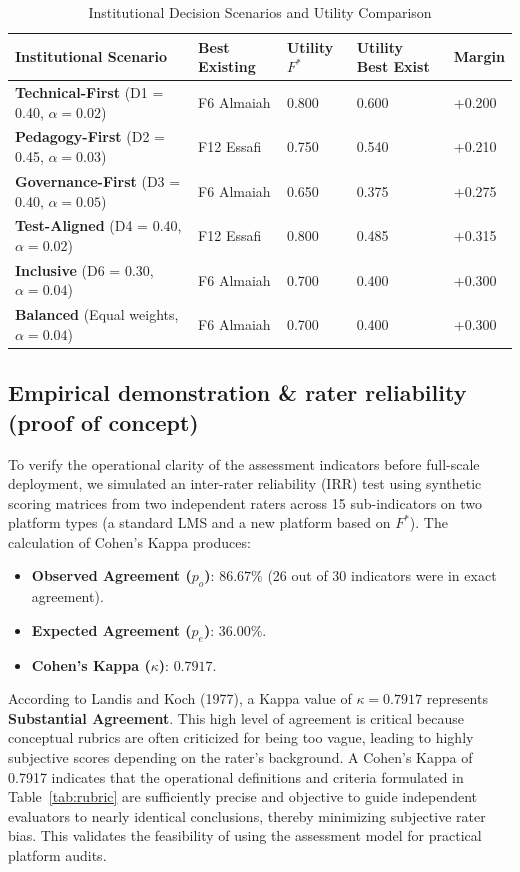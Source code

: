 \documentclass[11pt,a4paper]{article}
\begin{document}
\begin{table}[t]
  \caption{Institutional Decision Scenarios and Utility Comparison}
  \label{tab:scenarios}
  \centering
  \renewcommand{\arraystretch}{1.3}
  \begin{tabular}{@{} L{5.2cm} L{2.5cm} C{1.5cm} C{1.8cm} C{1.2cm} @{} }
    \toprule
    \textbf{Institutional Scenario} & \textbf{Best Existing} & \textbf{Utility $F^*$} & \textbf{Utility Best Exist} & \textbf{Margin} \\
    \midrule
    \textbf{Technical-First} (D1 = 0.40, $\alpha = 0.02$) & F6 Almaiah & 0.800 & 0.600 & +0.200 \\
    \textbf{Pedagogy-First} (D2 = 0.45, $\alpha = 0.03$) & F12 Essafi & 0.750 & 0.540 & +0.210 \\
    \textbf{Governance-First} (D3 = 0.40, $\alpha = 0.05$) & F6 Almaiah & 0.650 & 0.375 & +0.275 \\
    \textbf{Test-Aligned} (D4 = 0.40, $\alpha = 0.02$) & F12 Essafi & 0.800 & 0.485 & +0.315 \\
    \textbf{Inclusive} (D6 = 0.30, $\alpha = 0.04$) & F6 Almaiah & 0.700 & 0.400 & +0.300 \\
    \textbf{Balanced} (Equal weights, $\alpha = 0.04$) & F6 Almaiah & 0.700 & 0.400 & +0.300 \\
    \bottomrule
  \end{tabular}
\end{table}

\subsection{Empirical demonstration \& rater reliability (proof of concept)}

To verify the operational clarity of the assessment indicators before full-scale deployment, we simulated an inter-rater reliability (IRR) test using synthetic scoring matrices from two independent raters across 15 sub-indicators on two platform types (a standard LMS and a new platform based on $F^*$). The calculation of Cohen's Kappa produces:
\begin{itemize}
  \item \textbf{Observed Agreement ($p_o$)}: $86.67\%$ (26 out of 30 indicators were in exact agreement).
  \item \textbf{Expected Agreement ($p_e$)}: $36.00\%$.
  \item \textbf{Cohen's Kappa ($\kappa$)}: $0.7917$.
\end{itemize}
According to Landis and Koch (1977), a Kappa value of $\kappa = 0.7917$ represents \textbf{Substantial Agreement}. This high level of agreement is critical because conceptual rubrics are often criticized for being too vague, leading to highly subjective scores depending on the rater's background. A Cohen's Kappa of 0.7917 indicates that the operational definitions and criteria formulated in Table~\ref{tab:rubric} are sufficiently precise and objective to guide independent evaluators to nearly identical conclusions, thereby minimizing subjective rater bias. This validates the feasibility of using the assessment model for practical platform audits.
\end{document}
